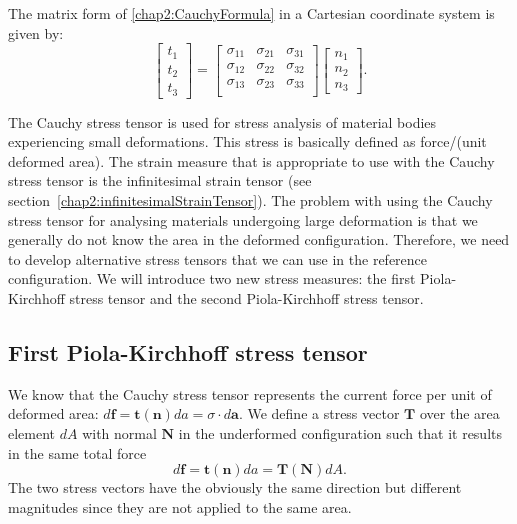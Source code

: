 The matrix form of \eqref{chap2:CauchyFormula} in a Cartesian coordinate system is given by:
\begin{equation}
	\begin{bmatrix}
		t_1 \\
		t_2 \\
		t_3
	\end{bmatrix}
= 
	\begin{bmatrix}
		\sigma_{11} & \sigma_{21} & \sigma_{31} \\
		\sigma_{12} & \sigma_{22} & \sigma_{32} \\
		\sigma_{13} & \sigma_{23} & \sigma_{33} \\
	\end{bmatrix}
	\begin{bmatrix}
		n_1 \\
		n_2 \\
		n_3
	\end{bmatrix}
	.
\end{equation}

The Cauchy stress tensor is used for stress analysis of material bodies experiencing small deformations. This stress is basically defined as force/(unit deformed area). The strain measure that is appropriate to use with the Cauchy stress tensor is the infinitesimal strain tensor (see section~\ref{chap2:infinitesimalStrainTensor}).  The problem with using the Cauchy stress tensor for analysing materials undergoing large deformation is that we generally do not know the area in the deformed configuration. Therefore, we need to develop alternative stress tensors that we can use in the reference configuration. We will introduce two new stress measures: the first Piola-Kirchhoff stress tensor and the second Piola-Kirchhoff stress tensor.

	\subsection{First Piola-Kirchhoff stress tensor}\label{chap2:PiolaStress1}
We know that the Cauchy stress tensor represents the current force per unit of deformed area: $d\mathbf{f} = \mathbf{t}(\mathbf{n}) da = \sigma \cdot d\mathbf{a}$. We define a stress vector $\mathbf{T}$ over the area element $dA$ with normal $\mathbf{N}$ in the underformed configuration such that it results in the same total force
\begin{equation}
\label{chap2:df}
d\mathbf{f} = \mathbf{t}(\mathbf{n}) da = \mathbf{T}(\mathbf{N}) dA.
\end{equation} 
The two stress vectors have the obviously the same direction but different magnitudes since they are not applied to the same area.


